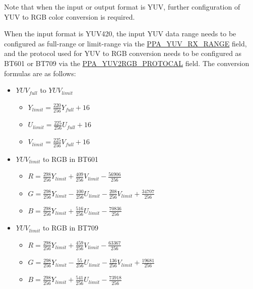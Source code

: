 \documentclass[main\_\_EN.tex]{subfiles}
\begin{document}
\begin{longtable}[c]{ |p{4cm}|p{4.2cm}|p{8.3cm}| }
\end{longtable}

Note that when the input or output format is YUV, further configuration of YUV to RGB color conversion is required.

When the input format is YUV420, the input YUV data range needs to be configured as full-range or limit-range via the \hyperref[fielddesc:PPAYUVRXRANGE]{PPA\_YUV\_RX\_RANGE} field, and the protocol used for YUV to RGB conversion needs to be configured as BT601 or BT709 via the \hyperref[fielddesc:PPAYUV2RGBPROTOCAL]{PPA\_YUV2RGB\_PROTOCAL} field. The conversion formulas are as follows:

\begin{itemize}
    \item $YUV_{full}$ to $YUV_{limit}$
        \begin{itemize}
            \item $Y_{limit} = \frac{220}{256} Y_{full} + 16$
            \item $U_{limit} = \frac{225}{256} U_{full} + 16$
            \item $V_{limit} = \frac{225}{256} V_{full} + 16$
        \end{itemize}
    \item $YUV_{limit}$ to RGB in BT601
        \begin{itemize}
            \item $R = \frac{298}{256}Y_{limit} + \frac{409}{256}V_{limit} - \frac{56906}{256}$
            \item $G = \frac{298}{256}Y_{limit} - \frac{100}{256}U_{limit} - \frac{208}{256}V_{limit} + \frac{34707}{256}$
            \item $B = \frac{298}{256}Y_{limit} + \frac{516}{256}U_{limit} -  \frac{70836}{256}$
        \end{itemize}
    \item $YUV_{limit}$ to RGB in BT709
        \begin{itemize}
            \item $R = \frac{298}{256}Y_{limit} + \frac{459}{256}V_{limit} - \frac{63367}{256}$
            \item $G = \frac{298}{256}Y_{limit} - \frac{55}{256}U_{limit} - \frac{136}{256}V_{limit} + \frac{19681}{256}$
            \item $B = \frac{298}{256}Y_{limit} + \frac{541}{256}U_{limit} -  \frac{73918}{256}$
        \end{itemize}
\end{itemize}
\end{document}
